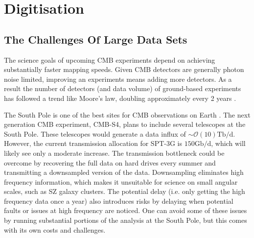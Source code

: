 \documentclass[apj]{emulateapj}
\begin{document}






\section{Digitisation}
\label{sec:dig}

\subsection{The Challenges Of Large Data Sets}
\label{subsec:problem}


The science goals of upcoming CMB experiments depend on achieving substantially faster mapping speeds. Given CMB detectors are generally photon noise limited, improving an experiments means adding more detectors. As a result the number of detectors (and data volume) of ground-based experiments has followed a trend like Moore's law, doubling approximately every 2 years \citep{s4sciencebook, Abazajian2015}.

The South Pole is one of the best sites for CMB observations on Earth \citep{kovac2007}. The next generation CMB experiment, CMB-S4, plans to include several telescopes at the South Pole. These telescopes would generate a data influx of $\sim\mathcal{O}(10)\mathrm{Tb/d}$. However, the current transmission allocation for SPT-3G is $150\mathrm{Gb/d}$, which will likely see only a moderate increase. The transmission bottleneck could be overcome by recovering the full data on hard drives every summer and transmitting a downsampled version of the data. Downsampling eliminates high frequency information, which makes it unsuitable for science on small angular scales, such as SZ galaxy clusters. The potential delay (i.e. only getting the high frequency data once a year) also introduces risks by delaying when potential faults or issues at high frequency are noticed. One can avoid some of these issues by running substantial portions of the analysis at the South Pole, but this comes with its own costs and challenges.
\end{document}
